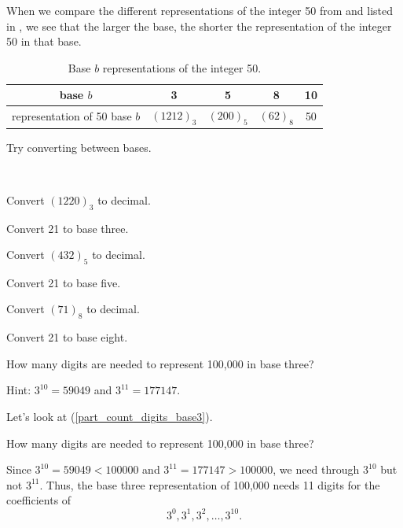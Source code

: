 When we compare the different representations of the integer 50 from  and  listed in , we see that the larger the base, the shorter the representation of the integer 50 in that base.

    \begin{table}[hbtp]
        \centering
        \begin{tabular}{c|c|c|c|c}
            base $b$ & 3 & 5 & 8 & 10 \\ \hline
            representation of 50 base $b$ & $(1212)_3$ & $(200)_5$ & $(62)_8$ & 50 \\
        \end{tabular}
        \caption{Base $b$ representations of the integer 50.}
        \label{table_baseb_50}
    \end{table}

Try converting between bases.

\begin{act}
\label{act_baseb_conv}
~
    \begin{actpart}
        \item Convert $(1220)_3$ to decimal.
        \item Convert 21 to base three. 
        \item Convert $(432)_5$ to decimal.
        \item Convert 21 to base five.
        \item Convert $(71)_8$ to decimal.
        \item Convert 21 to base eight.
        \item \label{part_count_digits_base3} How many digits are needed to represent 100,000 in base three?  
        
        Hint: $3^{10}=59049$ and $3^{11} = 177147$.
    \end{actpart}
\end{act}

Let's look at  (\ref{part_count_digits_base3}).

\begin{exam}
\label{exam_count_digits_base3}
    How many digits are needed to represent 100,000 in base three?
        \begin{soln}
            Since $3^{10}=59049<100000$ and $3^{11} = 177147>100000$, we need through $3^{10}$ but not $3^{11}$. Thus, the base three representation of 100,000 needs 11 digits for the coefficients of $$3^0, 3^1, 3^2, \ldots, 3^{10}.$$
        \end{soln}
\end{exam}



